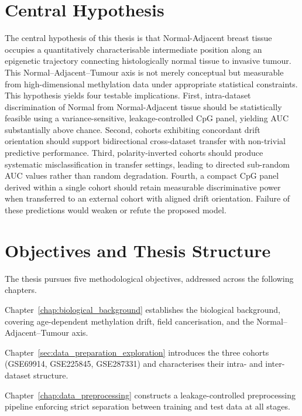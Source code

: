 \section{Central Hypothesis}
 
The central hypothesis of this thesis is that
Normal-Adjacent breast tissue occupies a
quantitatively characterisable intermediate
position along an epigenetic trajectory connecting
histologically normal tissue to invasive tumour.
This Normal--Adjacent--Tumour axis is not merely
conceptual but measurable from high-dimensional
methylation data under appropriate statistical constraints.
This hypothesis yields four testable implications.
First, intra-dataset discrimination of Normal from
Normal-Adjacent tissue should be statistically feasible
using a variance-sensitive, leakage-controlled CpG panel,
yielding AUC substantially above chance.
Second, cohorts exhibiting concordant drift orientation
should support bidirectional cross-dataset transfer
with non-trivial predictive performance.
Third, polarity-inverted cohorts should produce
systematic misclassification in transfer settings,
leading to directed sub-random AUC values rather
than random degradation.
Fourth, a compact CpG panel derived within a single
cohort should retain measurable discriminative power
when transferred to an external cohort with aligned
drift orientation. Failure of these predictions would weaken or refute
the proposed model.

\section{Objectives and Thesis Structure}

The thesis pursues five methodological objectives,
addressed across the following chapters.

Chapter~\ref{chap:biological_background} establishes
the biological background, covering
age-dependent methylation drift, field cancerisation,
and the Normal--Adjacent--Tumour axis.

Chapter~\ref{sec:data_preparation_exploration} introduces
the three cohorts (GSE69914, GSE225845, GSE287331)
and characterises their intra- and inter-dataset structure.


Chapter~\ref{chap:data_preprocessing} constructs a
leakage-controlled preprocessing pipeline enforcing
strict separation between training and test data
at all stages.


